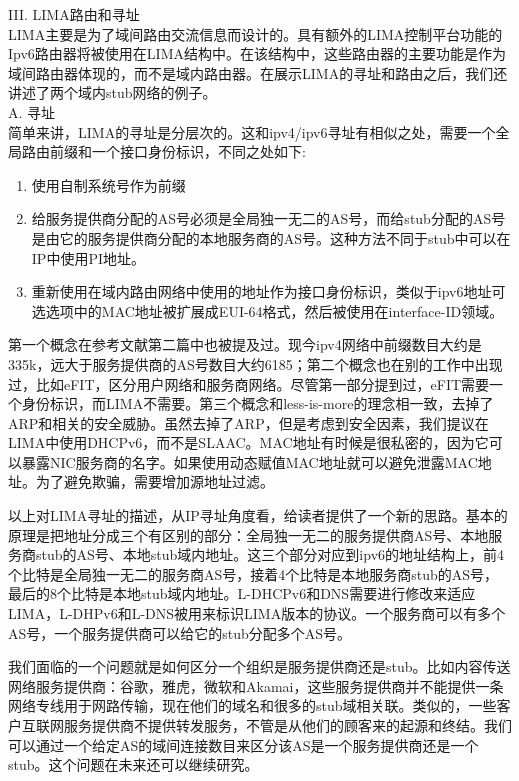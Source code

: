 III.	LIMA路由和寻址\\
LIMA主要是为了域间路由交流信息而设计的。具有额外的LIMA控制平台功能的Ipv6路由器将被使用在LIMA结构中。在该结构中，这些路由器的主要功能是作为域间路由器体现的，而不是域内路由器。在展示LIMA的寻址和路由之后，我们还讲述了两个域内stub网络的例子。\\
A.	寻址\\
简单来讲，LIMA的寻址是分层次的。这和ipv4/ipv6寻址有相似之处，需要一个全局路由前缀和一个接口身份标识，不同之处如下:

\begin{enumerate}
\item	使用自制系统号作为前缀
\item	给服务提供商分配的AS号必须是全局独一无二的AS号，而给stub分配的AS号是由它的服务提供商分配的本地服务商的AS号。这种方法不同于stub中可以在IP中使用PI地址。
\item   重新使用在域内路由网络中使用的地址作为接口身份标识，类似于ipv6地址可选选项中的MAC地址被扩展成EUI-64格式，然后被使用在interface-ID领域。
\end{enumerate}

第一个概念在参考文献第二篇中也被提及过。现今ipv4网络中前缀数目大约是335k，远大于服务提供商的AS号数目大约6185；第二个概念也在别的工作中出现过，比如eFIT，区分用户网络和服务商网络。尽管第一部分提到过，eFIT需要一个身份标识，而LIMA不需要。第三个概念和less-is-more的理念相一致，去掉了ARP和相关的安全威胁。虽然去掉了ARP，但是考虑到安全因素，我们提议在LIMA中使用DHCPv6，而不是SLAAC。MAC地址有时候是很私密的，因为它可以暴露NIC服务商的名字。如果使用动态赋值MAC地址就可以避免泄露MAC地址。为了避免欺骗，需要增加源地址过滤。


以上对LIMA寻址的描述，从IP寻址角度看，给读者提供了一个新的思路。基本的原理是把地址分成三个有区别的部分：全局独一无二的服务提供商AS号、本地服务商stub的AS号、本地stub域内地址。这三个部分对应到ipv6的地址结构上，前4个比特是全局独一无二的服务商AS号，接着4个比特是本地服务商stub的AS号，最后的8个比特是本地stub域内地址。L-DHCPv6和DNS需要进行修改来适应LIMA，L-DHPv6和L-DNS被用来标识LIMA版本的协议。一个服务商可以有多个AS号，一个服务提供商可以给它的stub分配多个AS号。


我们面临的一个问题就是如何区分一个组织是服务提供商还是stub。比如内容传送网络服务提供商：谷歌，雅虎，微软和Akamai，这些服务提供商并不能提供一条网络专线用于网路传输，现在他们的域名和很多的stub域相关联。类似的，一些客户互联网服务提供商不提供转发服务，不管是从他们的顾客来的起源和终结。我们可以通过一个给定AS的域间连接数目来区分该AS是一个服务提供商还是一个stub。这个问题在未来还可以继续研究。


